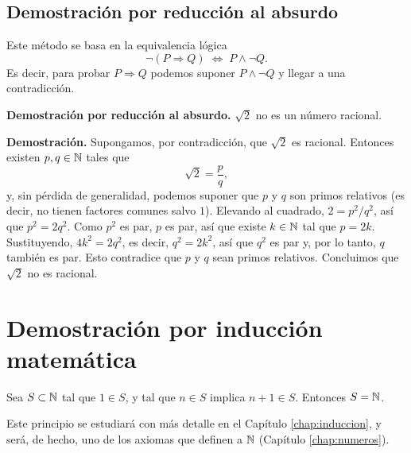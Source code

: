 \documentclass[12pt,a4paper]{book}
\begin{document}
    \subsection{Demostración por reducción al absurdo}

    Este método se basa en la equivalencia lógica
    \begin{equation*}
        \neg(P\Rightarrow Q) \;\Longleftrightarrow\; P\wedge\neg Q.
    \end{equation*}
    Es decir, para probar $P\Rightarrow Q$ podemos suponer $P\wedge\neg Q$ y llegar a una contradicción.

    \begin{ejemplo}
        \textbf{Demostración por reducción al absurdo.}
        $\sqrt{2}$ no es un número racional.

        \textbf{Demostración.} Supongamos, por contradicción, que $\sqrt{2}$ es racional. Entonces existen $p,q\in\mathbb{N}$ tales que
        \begin{equation*}
            \sqrt{2} = \frac{p}{q},
        \end{equation*}
        y, sin pérdida de generalidad, podemos suponer que $p$ y $q$ son primos relativos (es decir, no tienen factores comunes salvo $1$). Elevando al cuadrado, $2=p^2/q^2$, así que $p^2=2q^2$. Como $p^2$ es par, $p$ es par, así que existe $k\in\mathbb{N}$ tal que $p=2k$. Sustituyendo, $4k^2=2q^2$, es decir, $q^2=2k^2$, así que $q^2$ es par y, por lo tanto, $q$ también es par. Esto contradice que $p$ y $q$ sean primos relativos. Concluimos que $\sqrt{2}$ no es racional.
    \end{ejemplo}

    \section{Demostración por inducción matemática}

    \begin{proposicion}
        Sea $S\subset\mathbb{N}$ tal que $1\in S$, y tal que $n\in S$ implica $n+1\in S$. Entonces $S=\mathbb{N}$.
    \end{proposicion}

    Este principio se estudiará con más detalle en el Capítulo \ref{chap:induccion}, y será, de hecho, uno de los axiomas que definen a $\mathbb{N}$ (Capítulo \ref{chap:numeros}).
\end{document}
